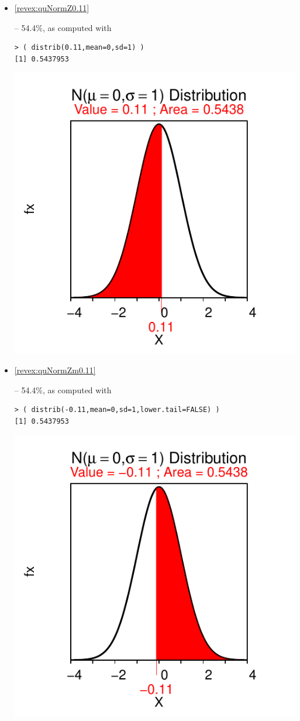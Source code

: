 \documentclass[10pt,openany]{book}\usepackage[]{graphicx}\usepackage[]{color}
\makeatletter
\newenvironment{kframe}{%
 \def\at@end@of@kframe{}%
 \ifinner\ifhmode%
  \def\at@end@of@kframe{\end{minipage}}%
  \begin{minipage}{\columnwidth}%
 \fi\fi%
 \def\FrameCommand##1{\hskip\@totalleftmargin \hskip-\fboxsep
 \colorbox{shadecolor}{##1}\hskip-\fboxsep
     \hskip-\linewidth \hskip-\@totalleftmargin \hskip\columnwidth}%
 \MakeFramed {\advance\hsize-\width
   \@totalleftmargin\z@ \linewidth\hsize
   \@setminipage}}%
 {\par\unskip\endMakeFramed%
 \at@end@of@kframe}
\newenvironment{knitrout}{}{} %
\makeatother
\begin{document}
\begin{itemize}
  \item \hypertarget{ans:quNormZ0.11}{\ref{revex:quNormZ0.11}} -- 54.4\%, as computed with
\begin{knitrout}
\color{fgcolor}\begin{kframe}
\begin{verbatim}
> ( distrib(0.11,mean=0,sd=1) )
[1] 0.5437953
\end{verbatim}
\end{kframe}

{\centering \includegraphics[width=.4\linewidth]{Figs/unnamed-chunk-215-1} 

}



\end{knitrout}
  \item \hypertarget{ans:quNormZm0.11}{\ref{revex:quNormZm0.11}} -- 54.4\%, as computed with
\begin{knitrout}
\color{fgcolor}\begin{kframe}
\begin{verbatim}
> ( distrib(-0.11,mean=0,sd=1,lower.tail=FALSE) )
[1] 0.5437953
\end{verbatim}
\end{kframe}

{\centering \includegraphics[width=.4\linewidth]{Figs/unnamed-chunk-216-1} 

}




\end{knitrout}
\end{itemize}
\end{document}
